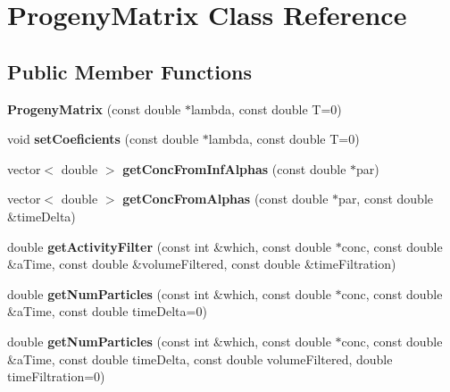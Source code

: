 \hypertarget{classProgenyMatrix}{\section{Progeny\+Matrix Class Reference}
\label{classProgenyMatrix}
}
\subsection*{Public Member Functions}
\begin{DoxyCompactItemize}
\item 
\hypertarget{classProgenyMatrix_a79232328f0be2c397ea9773c44f4913a}{{\bfseries Progeny\+Matrix} (const double $\ast$lambda, const double T=0)}\label{classProgenyMatrix_a79232328f0be2c397ea9773c44f4913a}

\item 
\hypertarget{classProgenyMatrix_a5fef82dcd5a0ff2b430852c92d407817}{void {\bfseries set\+Coeficients} (const double $\ast$lambda, const double T=0)}\label{classProgenyMatrix_a5fef82dcd5a0ff2b430852c92d407817}

\item 
\hypertarget{classProgenyMatrix_a0563a137e4337096eaebddad9cc1179b}{vector$<$ double $>$ {\bfseries get\+Conc\+From\+Inf\+Alphas} (const double $\ast$par)}\label{classProgenyMatrix_a0563a137e4337096eaebddad9cc1179b}

\item 
\hypertarget{classProgenyMatrix_ac4221da6b1d4a1c829aac5774260d516}{vector$<$ double $>$ {\bfseries get\+Conc\+From\+Alphas} (const double $\ast$par, const double \&time\+Delta)}\label{classProgenyMatrix_ac4221da6b1d4a1c829aac5774260d516}

\item 
\hypertarget{classProgenyMatrix_a53752e6ed1f655caa2761e5416f00128}{double {\bfseries get\+Activity\+Filter} (const int \&which, const double $\ast$conc, const double \&a\+Time, const double \&volume\+Filtered, const double \&time\+Filtration)}\label{classProgenyMatrix_a53752e6ed1f655caa2761e5416f00128}

\item 
\hypertarget{classProgenyMatrix_adf1b00db95a9dd67932e441ac9370970}{double {\bfseries get\+Num\+Particles} (const int \&which, const double $\ast$conc, const double \&a\+Time, const double time\+Delta=0)}\label{classProgenyMatrix_adf1b00db95a9dd67932e441ac9370970}

\item 
\hypertarget{classProgenyMatrix_af828e1acd29997e9c7f4ade2606b0d18}{double {\bfseries get\+Num\+Particles} (const int \&which, const double $\ast$conc, const double \&a\+Time, const double time\+Delta, const double volume\+Filtered, double time\+Filtration=0)}\label{classProgenyMatrix_af828e1acd29997e9c7f4ade2606b0d18}


\end{DoxyCompactItemize}
